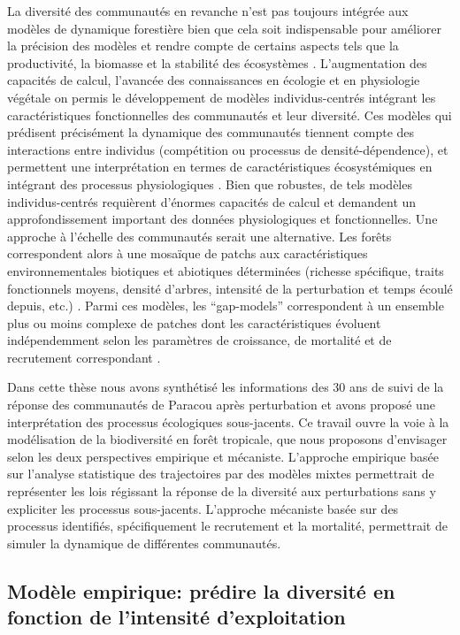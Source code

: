 \documentclass[
  11pt,
  french,
  A4paper,
  extrafontsizes,onecolumn,openright
  ]{memoir}
\begin{document}
La diversité des communautés en revanche n'est pas toujours intégrée aux
modèles de dynamique forestière bien que cela soit indispensable pour
améliorer la précision des modèles et rendre compte de certains aspects
tels que la productivité, la biomasse et la stabilité des écosystèmes
\autocite{Purves2008}. L'augmentation des capacités de calcul, l'avancée
des connaissances en écologie et en physiologie végétale on permis le
développement de modèles individus-centrés intégrant les
caractéristiques fonctionnelles des communautés et leur diversité. Ces
modèles qui prédisent précisément la dynamique des communautés tiennent
compte des interactions entre individus (compétition ou processus de
densité-dépendence), et permettent une interprétation en termes de
caractéristiques écosystémiques en intégrant des processus
physiologiques \autocite[@][]{Marechaux2017}. Bien que robustes, de tels
modèles individus-centrés requièrent d'énormes capacités de calcul et
demandent un approfondissement important des données physiologiques et
fonctionnelles. Une approche à l'échelle des communautés serait une
alternative. Les forêts correspondent alors à une mosaïque de patchs aux
caractéristiques environnementales biotiques et abiotiques déterminées
(richesse spécifique, traits fonctionnels moyens, densité d'arbres,
intensité de la perturbation et temps écoulé depuis, etc.)
\autocite{Porte2002}. Parmi ces modèles, les ``gap-models''
correspondent à un ensemble plus ou moins complexe de patches dont les
caractéristiques évoluent indépendemment selon les paramètres de
croissance, de mortalité et de recrutement correspondant
\autocite{Bugmann2001}.

Dans cette thèse nous avons synthétisé les informations des 30 ans de
suivi de la réponse des communautés de Paracou après perturbation et
avons proposé une interprétation des processus écologiques sous-jacents.
Ce travail ouvre la voie à la modélisation de la biodiversité en forêt
tropicale, que nous proposons d'envisager selon les deux perspectives
empirique et mécaniste. L'approche empirique basée sur l'analyse
statistique des trajectoires par des modèles mixtes permettrait de
représenter les lois régissant la réponse de la diversité aux
perturbations sans y expliciter les processus sous-jacents. L'approche
mécaniste basée sur des processus identifiés, spécifiquement le
recrutement et la mortalité, permettrait de simuler la dynamique de
différentes communautés.

\subsection{Modèle empirique: prédire la diversité en fonction de
l'intensité
d'exploitation}\label{modele-empirique-predire-la-diversite-en-fonction-de-lintensite-dexploitation}
\end{document}
